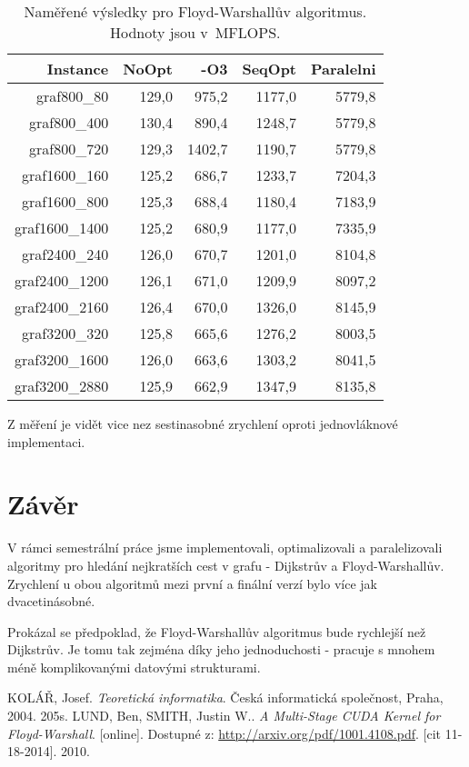 \documentclass[a4paper,11pt]{article}
\begin{document}
\begin{table}[H]
  \begin{center}
      \begin{tabular}{|r|r|r|r|r|}
      \hline
      Instance  	& NoOpt	    & -O3     & SeqOpt	& Paralelni	\\ \hline
      graf800\_80  	& 129,0     & 975,2   & 1177,0	& 5779,8     	\\ \hline
      graf800\_400     	& 130,4     & 890,4   & 1248,7	& 5779,8     	\\ \hline
      graf800\_720  	& 129,3     & 1402,7  & 1190,7	& 5779,8     	\\ \hline
      graf1600\_160    	& 125,2     & 686,7   & 1233,7	& 7204,3     	\\ \hline
      graf1600\_800  	& 125,3     & 688,4   & 1180,4	& 7183,9    	\\ \hline
      graf1600\_1400   	& 125,2     & 680,9   & 1177,0	& 7335,9    	\\ \hline
      graf2400\_240  	& 126,0     & 670,7   & 1201,0	& 8104,8       	\\ \hline
      graf2400\_1200   	& 126,1     & 671,0   & 1209,9	& 8097,2      	\\ \hline
      graf2400\_2160  	& 126,4     & 670,0   & 1326,0	& 8145,9       	\\ \hline
      graf3200\_320    	& 125,8     & 665,6   & 1276,2	& 8003,5       	\\ \hline
      graf3200\_1600  	& 126,0     & 663,6   & 1303,2	& 8041,5       	\\ \hline
      graf3200\_2880   	& 125,9     & 662,9   & 1347,9	& 8135,8       	\\ \hline
      \end{tabular}
  \caption{Naměřené výsledky pro Floyd-Warshallův algoritmus. Hodnoty jsou v~MFLOPS.}
  \label{tab:fw1}
  \end{center}
\end{table}
Z měření je vidět vice nez sestinasobné zrychlení oproti jednovláknové implementaci.

\newpage

\section{Závěr}
V rámci semestrální práce jsme implementovali, optimalizovali a paralelizovali algoritmy pro hledání nejkratších cest v grafu - Dijkstrův a Floyd-Warshallův. Zrychlení u obou algoritmů mezi první a finální verzí bylo více jak dvacetinásobné.
\par
Prokázal se předpoklad, že Floyd-Warshallův algoritmus bude rychlejší než Dijkstrův. Je tomu tak zejména díky jeho jednoduchosti - pracuje s mnohem méně komplikovanými datovými strukturami.


\newpage
\begin{thebibliography}{1}
   KOLÁŘ, Josef.
    \emph{Teoretická informatika}.
    Česká informatická společnost, Praha, 2004. 205s.
   LUND, Ben, SMITH, Justin W..
    \emph{A Multi-Stage CUDA Kernel for Floyd-Warshall}.
    [online]. Dostupné z: \url{http://arxiv.org/pdf/1001.4108.pdf}. [cit 11-18-2014]. 2010.
\end{thebibliography}
\end{document}
